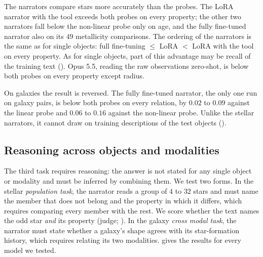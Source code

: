 The narrators compare stars more accurately than the probes. The LoRA narrator with the tool
exceeds both probes on every property; the other two narrators fall below the non-linear probe
only on age, and the fully fine-tuned narrator also on its $49$ metallicity comparisons. The
ordering of the narrators is the same as for single objects: full fine-tuning $\le$ LoRA $<$
LoRA with the tool on every property. As
for single objects, part of this advantage may be recall of the training text
(). Opus 5.5, reading the raw observations zero-shot, is below both probes
on every property except radius.

On galaxies the result is reversed. The fully fine-tuned narrator, the only one run on galaxy
pairs, is below both probes on every relation, by $0.02$ to $0.09$ against the linear probe and
$0.06$ to $0.16$ against the non-linear probe. Unlike
the stellar narrators, it cannot draw on training descriptions of the test objects
().

\subsection{Reasoning across objects and modalities}\label{sec:population}
The third task requires reasoning: the answer is not stated for any single object or
modality and must be inferred by combining them. We test two forms. In the stellar
\emph{population task}, the narrator reads a group of $4$ to $32$ stars and must name the member
that does not belong and the property in which it differs, which requires comparing every
member with the rest. We score whether the text names the odd star \emph{and} its property
(judge; ). In the galaxy \emph{cross modal task}, the narrator must state whether
a galaxy's shape agrees with its star-formation history, which requires relating its two
modalities.  gives the results for every model we tested.

